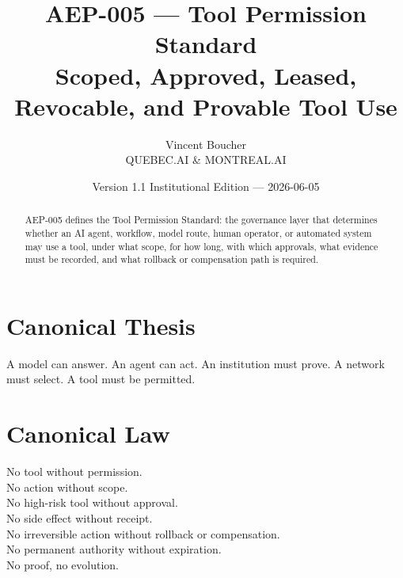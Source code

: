 \documentclass[11pt]{article}
\title{\textbf{AEP-005 --- Tool Permission Standard}\\\large Scoped, Approved, Leased, Revocable, and Provable Tool Use}
\author{Vincent Boucher\\QUEBEC.AI \& MONTREAL.AI}
\date{Version 1.1 Institutional Edition --- 2026-06-05}
\begin{document}
\maketitle

\begin{abstract}
AEP-005 defines the Tool Permission Standard: the governance layer that determines whether an AI agent, workflow, model route, human operator, or automated system may use a tool, under what scope, for how long, with which approvals, what evidence must be recorded, and what rollback or compensation path is required.
\end{abstract}

\section*{Canonical Thesis}
A model can answer. An agent can act. An institution must prove. A network must select. A tool must be permitted.

\section*{Canonical Law}
No tool without permission.\\
No action without scope.\\
No high-risk tool without approval.\\
No side effect without receipt.\\
No irreversible action without rollback or compensation.\\
No permanent authority without expiration.\\
No proof, no evolution.
\end{document}
